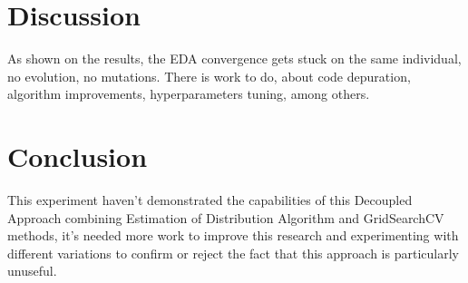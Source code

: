 \documentclass[10pt]{IEEEtran}
\begin{document}
\section{ Discussion }
As shown on the results, the EDA convergence gets stuck on the same individual,
no evolution, no mutations. There is work to do, about code depuration, algorithm
improvements, hyperparameters tuning, among others.

\section{ Conclusion }
This experiment haven't demonstrated the capabilities of this Decoupled Approach
combining Estimation of Distribution Algorithm and GridSearchCV methods, it's needed
more work to improve this research and experimenting with different variations
to confirm or reject the fact that this approach is particularly unuseful.


\printbibliography
\end{document}
